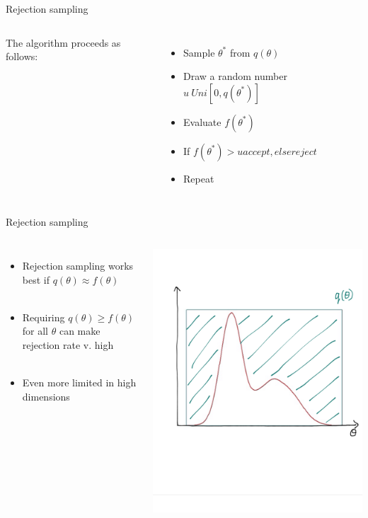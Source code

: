 \documentclass[compress]{beamer}
\begin{document}
\begin{frame}[label=sec-5-8]{Rejection sampling}
\begin{columns}[c]
The algorithm proceeds as follows:\\
\begin{itemize}
\item Sample $\theta^*$ from $q(\theta)$
\item Draw a random number $u ~ Uni[0, q(\theta^*)]$
\item Evaluate $f(\theta^*)$
\item If $f(\theta^*) > u accept, else reject$
\item Repeat
\end{itemize}
\end{columns}
\end{frame}

\begin{frame}[label=sec-5-9]{Rejection sampling}
\begin{columns}[c] 
\begin{itemize}
\item Rejection sampling works best if $q(\theta) \approx f(\theta)$ \\~\\
\item Requiring $q(\theta) \geqslant f(\theta)$ for all $\theta$ can make rejection rate v. high\\~\\
\item Even more limited in high dimensions
\end{itemize}

\includegraphics[width=.8\linewidth]{RS23.png}
\end{columns}
\end{frame}
\end{document}
